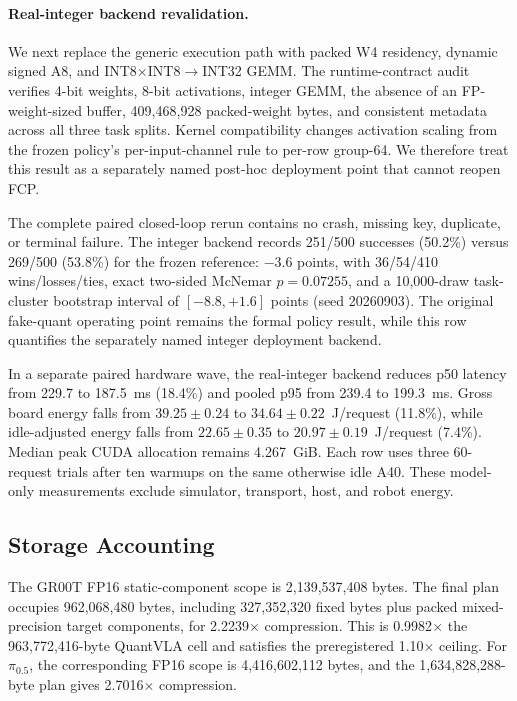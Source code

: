 \paragraph{Real-integer backend revalidation.}
We next replace the generic execution path with packed W4 residency, dynamic signed A8, and INT8$\times$INT8$\rightarrow$INT32 GEMM. The runtime-contract audit verifies 4-bit weights, 8-bit activations, integer GEMM, the absence of an FP-weight-sized buffer, 409,468,928 packed-weight bytes, and consistent metadata across all three task splits. Kernel compatibility changes activation scaling from the frozen policy's per-input-channel rule to per-row group-64. We therefore treat this result as a separately named post-hoc deployment point that cannot reopen FCP.

The complete paired closed-loop rerun contains no crash, missing key, duplicate, or terminal failure. The integer backend records 251/500 successes (50.2\%) versus 269/500 (53.8\%) for the frozen reference: $-3.6$ points, with 36/54/410 wins/losses/ties, exact two-sided McNemar $p=0.07255$, and a 10,000-draw task-cluster bootstrap interval of $[-8.8,+1.6]$ points (seed 20260903). The original fake-quant operating point remains the formal policy result, while this row quantifies the separately named integer deployment backend.

In a separate paired hardware wave, the real-integer backend reduces p50 latency from 229.7 to 187.5~ms (18.4\%) and pooled p95 from 239.4 to 199.3~ms. Gross board energy falls from $39.25\pm0.24$ to $34.64\pm0.22$~J/request (11.8\%), while idle-adjusted energy falls from $22.65\pm0.35$ to $20.97\pm0.19$~J/request (7.4\%). Median peak CUDA allocation remains 4.267~GiB. Each row uses three 60-request trials after ten warmups on the same otherwise idle A40. These model-only measurements exclude simulator, transport, host, and robot energy.

\subsection{Storage Accounting}

The GR00T FP16 static-component scope is 2,139,537,408 bytes. The final plan occupies 962,068,480 bytes, including 327,352,320 fixed bytes plus packed mixed-precision target components, for 2.2239$\times$ compression. This is 0.9982$\times$ the 963,772,416-byte QuantVLA cell and satisfies the preregistered 1.10$\times$ ceiling. For $\pi_{0.5}$, the corresponding FP16 scope is 4,416,602,112 bytes, and the 1,634,828,288-byte plan gives 2.7016$\times$ compression.

